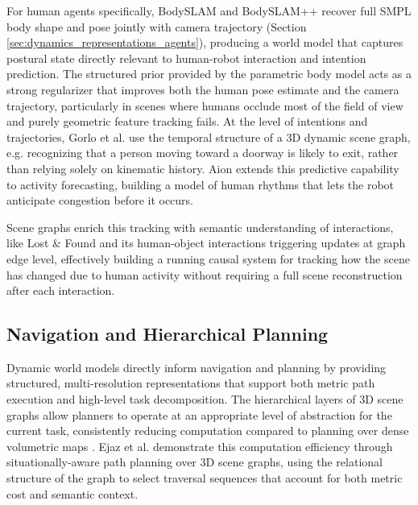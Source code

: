 For human agents specifically, BodySLAM \cite{henning_bodyslam_2022} and BodySLAM++ \cite{henning_bodyslam_2023} recover full SMPL body shape and pose jointly with camera trajectory (Section \ref{sec:dynamics_representations_agents}), producing a world model that captures postural state directly relevant to human-robot interaction and intention prediction. %
The structured prior provided by the parametric body model acts as a strong regularizer that improves both the human pose estimate and the camera trajectory, particularly in scenes where humans occlude most of the field of view and purely geometric feature tracking fails. 
At the level of intentions and trajectories, Gorlo et al. \cite{gorlo_long-term_2024} use the temporal structure of a 3D dynamic scene graph, e.g. recognizing that a person moving toward a doorway is likely to exit, rather than relying solely on kinematic history.
Aion \cite{catalano_aion_2025} extends this predictive capability to activity forecasting, building a model of human rhythms that lets the robot anticipate congestion before it occurs. %

Scene graphs enrich this tracking with semantic understanding of interactions, like Lost \& Found \cite{behrens_lost_2025} and its human-object interactions triggering updates at graph edge level, effectively building a running causal system for tracking how the scene has changed due to human activity without requiring a full scene reconstruction after each interaction.

\subsection{Navigation and Hierarchical Planning}\label{sec:applications_navigation}
Dynamic world models directly inform navigation and planning by providing structured, multi-resolution representations that support both metric path execution and high-level task decomposition.
The hierarchical layers of 3D scene graphs allow planners to operate at an appropriate level of abstraction for the current task, consistently reducing computation compared to planning over dense volumetric maps \cite{ray2024taskmotionplanninghierarchical} \cite{viswanathan2025spadescalablepathplanning}. Ejaz et al. \cite{ejaz2025situationallyawarepathplanningexploiting} demonstrate this computation efficiency through situationally-aware path planning over 3D scene graphs, using the relational structure of the graph to select traversal sequences that account for both metric cost and semantic context. 

